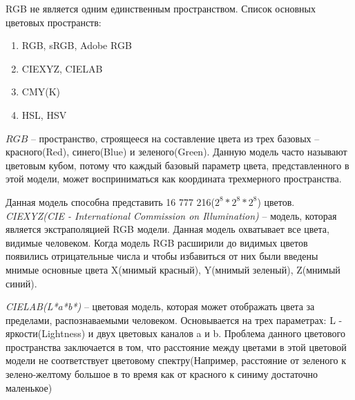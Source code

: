 RGB не является одним единственным пространством. Список основных цветовых пространств:
\begin{enumerate}
	\item RGB, sRGB, Adobe RGB
	\item CIEXYZ, CIELAB
	\item CMY(K)
	\item HSL, HSV
\end{enumerate}

$RGB$ -- пространство, строящееся на составление цвета из трех базовых -- красного(Red), синего(Blue) и зеленого(Green). Данную модель часто называют цветовым кубом, потому что каждый базовый параметр цвета, представленного в этой модели, может восприниматься как координата трехмерного пространства.

\begin{figure}[ht!]
\end{figure}

Данная модель способна представить 16 777 216(\(2^8 * 2^8 * 2^8\)) цветов.\\

\textit{CIEXYZ(CIE - International Commission on Illumination)} -- модель, которая является экстраполяцией RGB модели. Данная модель охватывает все цвета, видимые человеком. Когда модель RGB расширили до видимых цветов появились отрицательные числа и чтобы избавиться от них были введены мнимые основные цвета X(мнимый красный), Y(мнимый зеленый), Z(мнимый синий).

\textit{CIELAB(L*a*b*)} -- цветовая модель, которая может отображать цвета за пределами, распознаваемыми человеком. Основывается на трех параметрах: L - яркости(Lightness) и двух цветовых каналов a и b. Проблема данного цветового пространства заключается в том, что расстояние между цветами в этой цветовой модели не соответствует цветовому спектру(Например, расстояние от зеленого к зелено-желтому большое в то время как от красного к синиму достаточно маленькое)

